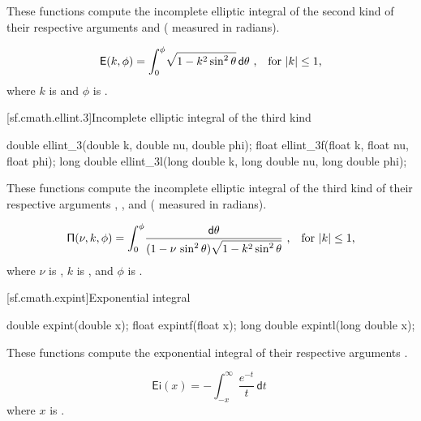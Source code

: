 \begin{itemdescr}
\pnum
\effects
These functions compute
the incomplete elliptic integral of the second kind
of their respective arguments
 and  ( measured in radians).

\pnum
\returns
\[ \mathsf{E}(k, \phi) = \int_0^\phi \! \sqrt{1 - k^2 \sin^2 \theta} \, \mathsf{d}\theta
   \text{ ,\quad for $|k| \le 1$,} \]
where
$k$ is  and
$\phi$ is .
\end{itemdescr}

[sf.cmath.ellint.3]{Incomplete elliptic integral of the third kind}%
%
%
%
%
%
\begin{itemdecl}
double       ellint_3(double k, double nu, double phi);
float        ellint_3f(float k, float nu, float phi);
long double  ellint_3l(long double k, long double nu, long double phi);
\end{itemdecl}

\begin{itemdescr}

\pnum
\effects
These functions compute
the incomplete elliptic integral of the third kind
of their respective arguments
, , and  ( measured in radians).

\pnum
\returns
\[ \mathsf{\Pi}(\nu, k, \phi) = \int_0^\phi \!
   \frac{ \mathsf{d}\theta }{ (1 - \nu \, \sin^2 \theta) \sqrt{1 - k^2 \sin^2 \theta} } \text{ ,\quad for $|k| \le 1$,} \]
where
$\nu$ is ,
$k$ is , and
$\phi$ is .
\end{itemdescr}

[sf.cmath.expint]{Exponential integral}%
%
%
%
%
%
\begin{itemdecl}
double       expint(double x);
float        expintf(float x);
long double  expintl(long double x);
\end{itemdecl}

\begin{itemdescr}

\pnum
\effects
These functions compute the exponential integral
of their respective arguments
.

\pnum
\returns
\[%
  \mathsf{Ei}(x) =
  - \int_{-x}^\infty \frac{e^{-t}}
                          {t     } \, \mathsf{d}t
\;
\]
where
$x$ is .

\end{itemdescr}

